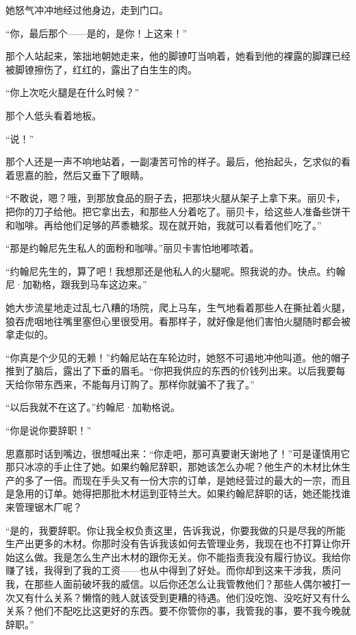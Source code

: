 \par 她怒气冲冲地经过他身边，走到门口。
\par “你，最后那个——是的，是你！上这来！”
\par 那个人站起来，笨拙地朝她走来，他的脚镣叮当响着，她看到他的裸露的脚踝已经被脚镣擦伤了，红红的，露出了白生生的肉。
\par “你上次吃火腿是在什么时候？”
\par 那个人低头看着地板。
\par “说！”
\par 那个人还是一声不响地站着，一副凄苦可怜的样子。最后，他抬起头，乞求似的看着思嘉的脸，然后又垂下了眼睛。
\par “不敢说，嗯？哦，到那放食品的厨子去，把那块火腿从架子上拿下来。丽贝卡，把你的刀子给他。把它拿出去，和那些人分着吃了。丽贝卡，给这些人准备些饼干和咖啡。再给他们足够的芦黍糖浆。现在就开始，我就可以看着他们吃了。”
\par “那是约翰尼先生私人的面粉和咖啡。”丽贝卡害怕地嘟哝着。
\par “约翰尼先生的，算了吧！我想那还是他私人的火腿呢。照我说的办。快点。约翰尼·加勒格，跟我到马车这边来。”
\par 她大步流星地走过乱七八糟的场院，爬上马车，生气地看着那些人在撕扯着火腿，狼吞虎咽地往嘴里塞但心里很受用。看那样子，就好像是他们害怕火腿随时都会被拿走似的。
\par “你真是个少见的无赖！”约翰尼站在车轮边时，她怒不可遏地冲他叫道。他的帽子推到了脑后，露出了下垂的眉毛。“你把我供应的东西的价钱列出来。以后我要每天给你带东西来，不能每月订购了。那样你就骗不了我了。”
\par “以后我就不在这了。”约翰尼·加勒格说。
\par “你是说你要辞职！”
\par 思嘉那时话到嘴边，很想喊出来：“你走吧，那可真要谢天谢地了！”可是谨慎用它那只冰凉的手止住了她。如果约翰尼辞职，那她该怎么办呢？他生产的木材比休生产的多了一倍。而现在手头又有一份大宗的订单，是她经营过的最大的一宗，而且是急用的订单。她得把那批木材运到亚特兰大。如果约翰尼辞职的话，她还能找谁来管理锯木厂呢？
\par “是的，我要辞职。你让我全权负责这里，告诉我说，你要我做的只是尽我的所能生产出更多的木材。你那时没有告诉我该如何去管理业务，我现在也不打算让你开始这么做。我是怎么生产出木材的跟你无关。你不能指责我没有履行协议。我给你赚了钱，我得到了我的工资——也从中得到了好处。而你却到这来干涉我，质问我，在那些人面前破坏我的威信。以后你还怎么让我管教他们？那些人偶尔被打一次又有什么关系？懒惰的贱人就该受到更糟的待遇。他们没吃饱、没吃好又有什么关系？他们不配吃比这更好的东西。要不你管你的事，我管我的事，要不我今晚就辞职。”

